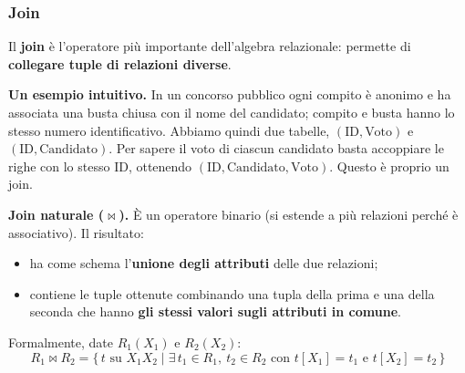 \documentclass[12pt]{extarticle}
\begin{document}
\subsubsection{Join}
\noindent Il \textbf{join} è l'operatore più importante dell'algebra relazionale: permette di \textbf{collegare tuple di relazioni diverse}.

\medskip
\noindent \textbf{Un esempio intuitivo.} In un concorso pubblico ogni compito è anonimo e ha associata una busta chiusa con il nome del candidato; compito e busta hanno lo stesso numero identificativo. Abbiamo quindi due tabelle, $(\text{ID}, \text{Voto})$ e $(\text{ID}, \text{Candidato})$. Per sapere il voto di ciascun candidato basta accoppiare le righe con lo stesso ID, ottenendo $(\text{ID}, \text{Candidato}, \text{Voto})$. Questo è proprio un join.

\medskip
\noindent \textbf{Join naturale ($\bowtie$).} È un operatore binario (si estende a più relazioni perché è associativo). Il risultato:
\begin{itemize}
    \item ha come schema l'\textbf{unione degli attributi} delle due relazioni;
    \item contiene le tuple ottenute combinando una tupla della prima e una della seconda che hanno \textbf{gli stessi valori sugli attributi in comune}.
\end{itemize}
Formalmente, date $R_1(X_1)$ e $R_2(X_2)$:
\[
R_1 \bowtie R_2 = \{\, t \text{ su } X_1 X_2 \mid \exists\, t_1 \in R_1,\ t_2 \in R_2 \text{ con } t[X_1] = t_1 \text{ e } t[X_2] = t_2 \,\}
\]
\end{document}
